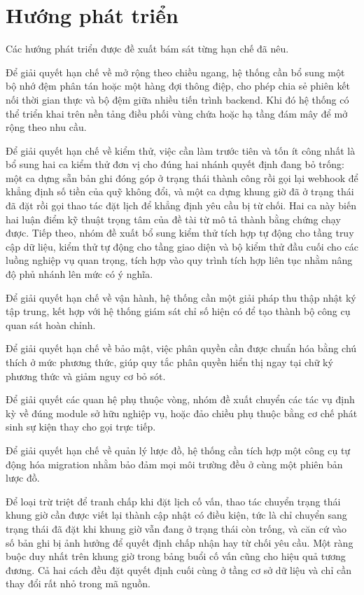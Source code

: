 \documentclass[12pt,a4paper,oneside]{report}
\begin{document}
\section{Hướng phát triển}

Các hướng phát triển được đề xuất bám sát từng hạn chế đã nêu.

Để giải quyết hạn chế về mở rộng theo chiều ngang, hệ thống cần bổ sung một bộ nhớ đệm phân tán hoặc một hàng đợi thông điệp, cho phép chia sẻ phiên kết nối thời gian thực và bộ đệm giữa nhiều tiến trình backend. Khi đó hệ thống có thể triển khai trên nền tảng điều phối vùng chứa hoặc hạ tầng đám mây để mở rộng theo nhu cầu.

Để giải quyết hạn chế về kiểm thử, việc cần làm trước tiên và tốn ít công nhất là bổ sung hai ca kiểm thử đơn vị cho đúng hai nhánh quyết định đang bỏ trống: một ca dựng sẵn bản ghi đóng góp ở trạng thái thành công rồi gọi lại webhook để khẳng định số tiền của quỹ không đổi, và một ca dựng khung giờ đã ở trạng thái đã đặt rồi gọi thao tác đặt lịch để khẳng định yêu cầu bị từ chối. Hai ca này biến hai luận điểm kỹ thuật trọng tâm của đề tài từ mô tả thành bằng chứng chạy được. Tiếp theo, nhóm đề xuất bổ sung kiểm thử tích hợp tự động cho tầng truy cập dữ liệu, kiểm thử tự động cho tầng giao diện và bộ kiểm thử đầu cuối cho các luồng nghiệp vụ quan trọng, tích hợp vào quy trình tích hợp liên tục nhằm nâng độ phủ nhánh lên mức có ý nghĩa.

Để giải quyết hạn chế về vận hành, hệ thống cần một giải pháp thu thập nhật ký tập trung, kết hợp với hệ thống giám sát chỉ số hiện có để tạo thành bộ công cụ quan sát hoàn chỉnh.

Để giải quyết hạn chế về bảo mật, việc phân quyền cần được chuẩn hóa bằng chú thích ở mức phương thức, giúp quy tắc phân quyền hiển thị ngay tại chữ ký phương thức và giảm nguy cơ bỏ sót.

Để giải quyết các quan hệ phụ thuộc vòng, nhóm đề xuất chuyển các tác vụ định kỳ về đúng module sở hữu nghiệp vụ, hoặc đảo chiều phụ thuộc bằng cơ chế phát sinh sự kiện thay cho gọi trực tiếp.

Để giải quyết hạn chế về quản lý lược đồ, hệ thống cần tích hợp một công cụ tự động hóa migration nhằm bảo đảm mọi môi trường đều ở cùng một phiên bản lược đồ.

Để loại trừ triệt để tranh chấp khi đặt lịch cố vấn, thao tác chuyển trạng thái khung giờ cần được viết lại thành cập nhật có điều kiện, tức là chỉ chuyển sang trạng thái đã đặt khi khung giờ vẫn đang ở trạng thái còn trống, và căn cứ vào số bản ghi bị ảnh hưởng để quyết định chấp nhận hay từ chối yêu cầu. Một ràng buộc duy nhất trên khung giờ trong bảng buổi cố vấn cũng cho hiệu quả tương đương. Cả hai cách đều đặt quyết định cuối cùng ở tầng cơ sở dữ liệu và chỉ cần thay đổi rất nhỏ trong mã nguồn.
\end{document}
